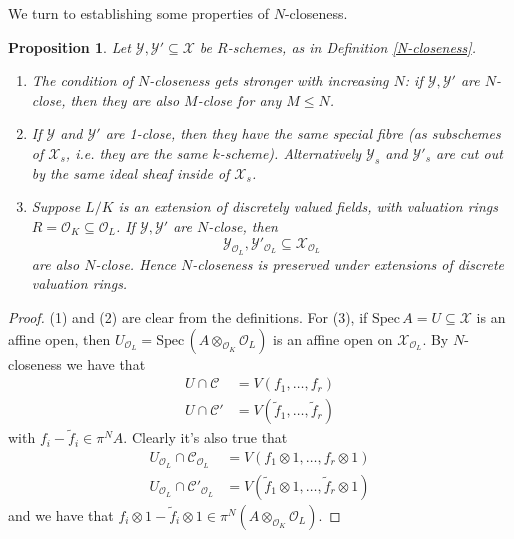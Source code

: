 \documentclass{article}
\theoremstyle{definition}
\theoremstyle{plain}
\newtheorem{prop}[defn]{Proposition}
\theoremstyle{remark}
\newcommand{\spec}{\mathrm{Spec}\,}
\begin{document}
	We turn to establishing some properties of $N$-closeness. 
	\begin{prop}
		Let $\mathcal{Y},\mathcal{Y}'\subseteq \mathcal{X}$ be $R$-schemes, as in Definition \ref{N-closeness}. 
		\begin{enumerate}\label{closeness_properties}
			\item The condition of $N$-closeness gets stronger with increasing $N$: if $\mathcal{Y}, \mathcal{Y}'$ are $N$-close, then they are also $M$-close for any $M\le N$.
			\item If $\mathcal{Y}$ and $\mathcal{Y}'$ are 1-close, then they have the same special fibre (as subschemes of $\mathcal{X}_s$, i.e. they are the same $k$-scheme). Alternatively $\mathcal{Y}_s$ and  $\mathcal{Y}'_s$ are cut out by the same ideal sheaf inside of $\mathcal{X}_s$.
			\item Suppose $L/K$ is an extension of discretely valued fields, with valuation rings $R = \mathcal{O}_K\subseteq \mathcal{O}_L$. If $\mathcal{Y}, \mathcal{Y}'$ are $N$-close, then 
			\[\mathcal{Y}_{\mathcal{O}_L}, \mathcal{Y}'_{\mathcal{O}_L}\subseteq \mathcal{X}_{\mathcal{O}_L}\]
			are also $N$-close. Hence $N$-closeness is preserved under extensions of discrete valuation rings.
		\end{enumerate}
	\end{prop}
	\begin{proof}
		(1) and (2) are clear from the definitions. For (3), if $\spec A = U\subseteq \mathcal{X}$ is an affine open, then $U_{\mathcal{O}_L} = \spec (A\otimes_{\mathcal{O}_K}\mathcal{O}_L)$ is an affine open on $\mathcal{X}_{\mathcal{O}_L}$. By $N$-closeness we have that
		\begin{align*}
			U\cap \mathcal{C} &= V(f_1, \ldots, f_r)\\
			U\cap \mathcal{C'} &= V(\widetilde{f}_1, \ldots, \widetilde{f}_r)
		\end{align*}
		with $f_i-\widetilde{f}_i\in \pi^N A$. Clearly it's also true that
		\begin{align*}
			U_{\mathcal{O}_L} \cap \mathcal{C}_{\mathcal{O}_L} &= V(f_1\otimes 1, \ldots, f_r\otimes 1)\\
			U_{\mathcal{O}_L} \cap \mathcal{C}'_{\mathcal{O}_L} &= V(\widetilde{f}_1\otimes 1, \ldots, \widetilde{f}_r\otimes 1)
		\end{align*}
		and we have that $f_i\otimes 1 - \widetilde{f}_i\otimes 1 \in \pi^N(A\otimes_{\mathcal{O}_K} \mathcal{O}_L)$.
	\end{proof}
	
\end{document}
